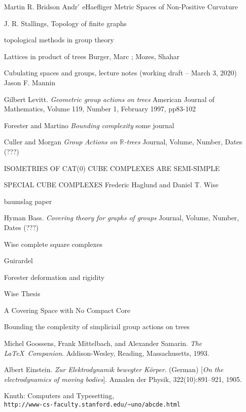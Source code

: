 \documentclass[12pt,parskip=full]{report}
\theoremstyle{plain}
\theoremstyle{definition}
\begin{document}
\begin{thebibliography}{9}


Martin R. Bridson Andr ́
eHaefliger
Metric Spaces of
Non-Positive Curvature

 J. R. Stallings, Topology of finite graphs

topological methods in group theory

Lattices in product of trees
Burger, Marc  ; Mozes, Shahar

Cubulating spaces and groups, lecture notes
(working draft – March 3, 2020)
Jason F. Mannin

Gilbert Levitt.
\textit{Geometric group actions on trees}
American Journal of Mathematics, Volume 119, Number 1, February 1997, pp83-102

Forester and Martino
\textit{Bounding complexity}
some journal

Culler and Morgan
\textit{Group Actions on $\mathbb{R}$-trees}
Journal, Volume, Number, Dates (???)

ISOMETRIES OF CAT(0) CUBE COMPLEXES ARE SEMI-SIMPLE

SPECIAL CUBE COMPLEXES
Frederic Haglund and Daniel T. Wise

baumslag paper

Hyman Bass.
\textit{Covering theory for graphs of groups}
Journal, Volume, Number, Dates (???)


Wise complete square complexes

Guirardel

Forester deformation and rigidity

Wise Thesis

A Covering Space with No Compact Core

Bounding the complexity of simpliciail group actions
on trees 


Michel Goossens, Frank Mittelbach, and Alexander Samarin. 
\textit{The \LaTeX\ Companion}. 
Addison-Wesley, Reading, Massachusetts, 1993.

Albert Einstein. 
\textit{Zur Elektrodynamik bewegter K{\"o}rper}. (German) 
[\textit{On the electrodynamics of moving bodies}]. 
Annalen der Physik, 322(10):891–921, 1905.

Knuth: Computers and Typesetting,
\\\texttt{http://www-cs-faculty.stanford.edu/\~{}uno/abcde.html}

\end{thebibliography}



\end{document}
